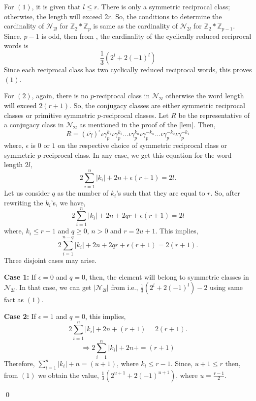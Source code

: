 \documentclass[11pt]{amsart}
\renewenvironment{proof}{{\bfseries Proof.}}{\qed}
\numberwithin{equation}{section}
\theoremstyle{definition}
\newcommand{\gt}{\tilde{\gamma}}
\newcommand{\tb}{\textbf}
\newcommand{\imp}{\Rightarrow}
\newcommand{\z}{\mathbb{Z}}
\newcommand{\g}{\gamma_{p}}
\newcommand{\io}{\iota }
\numberwithin{equation}{section}
\begin{document}
		\begin{proof}
			For $(1)$, it is given that  $l\leq r$.  There is only a symmetric reciprocal class; otherwise, the length will exceed $2r$.
			So, the conditions to determine the cardinality of $\mathcal{N}_{2l}$ for $\z_{2}*\z_{p}$ is same as the cardinality of $\mathcal{N}_{2l}$ for $\z_{2}*\z_{p-1}$. Since, $p-1$ is odd, then from \cite[Theorem 5.3.2.]{Ma}, the cardinality of the cyclically reduced reciprocal words is 
			\[\frac{1}{3}(2^{l}+2(-1)^{l})\]
			Since each reciprocal class has two cyclically reduced reciprocal words, this proves $(1)$.			
			
			For $(2)$,
			again, there is no $p$-reciprocal class in $\mathcal{N}_{2l}$ otherwise the word length will exceed $2(r+1).$ So, the conjugacy classes are either symmetric reciprocal classes or primitive symmetric $p $-reciprocal classes. Let $R$ be the representative of a conjugacy class in $\mathcal{N}_{2l}$ as mentioned in the proof of the \ref{lem}. Then, \[R=(\io\gt)^{\epsilon}\io  \g^{k_{1}}\io \g^{k_{2}}\dots \io \g^{k_{n}}\io \g^{-k_{n}}\dots\io \g^{-k_{2}}\io \g^{-k_{1}} \] where, $\epsilon$ is $0$ or $1$ on the respective choice of symmetric reciprocal class or symmetric $ p$-reciprocal class.  In any case, we get this equation for the word length $2l$,
			\begin{equation}
				2\sum_{i=1}^{n}|k_{i}| +2n+\epsilon(r+1)= 2l.
			\end{equation}
			Let us consider $q$ as the number of $ k_i$'s such that they are equal to $r.$ So,  after rewriting the $k_{i}$'s, we have,
			\begin{equation}
				2\sum_{i=1}^{n}|k_{i}| +2n+2qr+\epsilon(r+1)= 2l
			\end{equation} where, $k_{i}\leq r-1$ and $q\geq 0$, $n>0$ and $r=2u+1. $ 
			This implies, \[2\sum_{i=1}^{n-q}|k_{i}| +2n+2qr+\epsilon(r+1)= 2(r+1).\]
			Three disjoint cases may arise.
			
			\medskip  \tb{Case 1:}	If $\epsilon=0$ and $q=0$,
			then, the element will belong to symmetric classes in $\mathcal{N}_{2l}.$ In that case, we can get $|\mathcal{N}_{2l}|$ from \cite[Theorem 5.3.2.]{Ma} i.e., $\frac{ 1}{3}(2^{l}+2(-1)^{l})-2$ using same fact as $(1)$. 
			
			\tb{Case 2:} 	If	$\epsilon=1$ and $q=0$, this implies, \[2\sum_{i=1}^{n}|k_{i}| +2n+(r+1)= 2(r+1).\]
			\[\imp 2\sum_{i=1}^{n}|k_{i}| +2n+=(r+1) \]
			Therefore, $\sum_{i=1}^{n}|k_{i}| +n=(u+1)$, 
			where $k_{i}\leq r-1.$ Since, $u+1\leq r$ then, from $(1)$ we obtain the value, $\frac{ 1}{3}(2^{u+1}+2(-1)^{u+1})$,  where $u=\frac{r-1}{2}.$
			

\end{proof}
\end{document}
